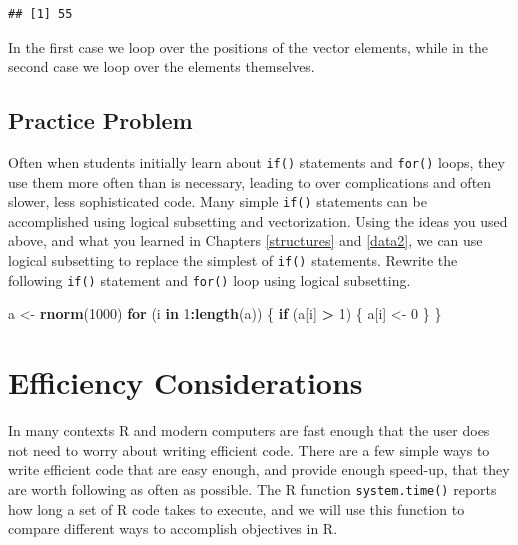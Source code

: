 \documentclass[
]{krantz}
\newenvironment{Shaded}{\begin{snugshade}}{\end{snugshade}}
\newcommand{\ControlFlowTok}[1]{\textcolor[rgb]{0.13,0.29,0.53}{\textbf{#1}}}
\newcommand{\DecValTok}[1]{\textcolor[rgb]{0.00,0.00,0.81}{#1}}
\newcommand{\KeywordTok}[1]{\textcolor[rgb]{0.13,0.29,0.53}{\textbf{#1}}}
\newcommand{\NormalTok}[1]{#1}
\newcommand{\OperatorTok}[1]{\textcolor[rgb]{0.81,0.36,0.00}{\textbf{#1}}}
\newcommand{\StringTok}[1]{\textcolor[rgb]{0.31,0.60,0.02}{#1}}
\begin{document}
\begin{verbatim}
## [1] 55
\end{verbatim}

In the first case we loop over the positions of the vector elements, while in the second case we loop over the elements themselves.

\hypertarget{ch7PP2}{%
\subsection{Practice Problem}\label{ch7PP2}}

Often when students initially learn about \texttt{if()} statements and \texttt{for()} loops, they use them more often than is necessary, leading to over complications and often slower, less sophisticated code. Many simple \texttt{if()} statements can be accomplished using logical subsetting and vectorization. Using the ideas you used above, and what you learned in Chapters \ref{structures} and \ref{data2}, we can use logical subsetting to replace the simplest of \texttt{if()} statements. Rewrite the following \texttt{if()} statement and \texttt{for()} loop using logical subsetting.

\begin{Shaded}
\begin{Highlighting}[]
\NormalTok{a \textless{}{-}}\StringTok{ }\KeywordTok{rnorm}\NormalTok{(}\DecValTok{1000}\NormalTok{)}
\ControlFlowTok{for}\NormalTok{ (i }\ControlFlowTok{in} \DecValTok{1}\OperatorTok{:}\KeywordTok{length}\NormalTok{(a)) \{}
  \ControlFlowTok{if}\NormalTok{ (a[i] }\OperatorTok{\textgreater{}}\StringTok{ }\DecValTok{1}\NormalTok{) \{}
\NormalTok{    a[i] \textless{}{-}}\StringTok{ }\DecValTok{0}
\NormalTok{  \}}
\NormalTok{\}}
\end{Highlighting}
\end{Shaded}

\hypertarget{efficiency-considerations}{%
\section{Efficiency Considerations}\label{efficiency-considerations}}

In many contexts R and modern computers are fast enough that the user does not need to worry about writing efficient code. There are a few simple ways to write efficient code that are easy enough, and provide enough speed-up, that they are worth following as often as possible. The R function \texttt{system.time()} reports how long a set of R code takes to execute, and we will use this function to compare different ways to accomplish objectives in R.
\end{document}
